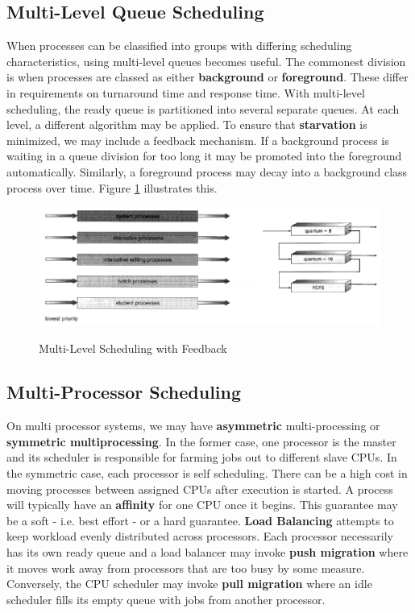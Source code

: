 \documentclass[10pt,a4paper]{article}
\begin{document}
\subsection{Multi-Level Queue Scheduling}
When processes can be classified into groups with differing scheduling characteristics, using multi-level queues becomes useful. The commonest division is when processes are classed as either {\bf background} or {\bf foreground}. These differ in requirements on turnaround time and response time. With multi-level scheduling, the ready queue is partitioned into several separate queues. At each level, a different algorithm may be applied. To ensure that {\bf starvation} is minimized, we may include a feedback mechanism. If a background process is waiting in a queue division for too long it may be promoted into the foreground automatically. Similarly, a foreground process may decay into a background class process over time. Figure \ref{mlq} illustrates this. 
\begin{figure}
\caption{Multi-Level Scheduling with Feedback \cite{OSCONCEPTS}}
\begin{center}
\includegraphics[scale=0.36]{../images/ml-sched.png}
\label{mlq}
\end{center}
\end{figure}
\subsection{Multi-Processor Scheduling}
On multi processor systems, we may have {\bf asymmetric} multi-processing or {\bf symmetric multiprocessing}. In the former case, one processor is the master and its scheduler is responsible for farming jobs out to different slave CPUs. In the symmetric case, each processor is self scheduling. There can be a high cost in moving processes between assigned CPUs after execution is started. A process will typically have an {\bf affinity} for one CPU once it begins. This guarantee may be a soft - i.e. best effort - or a hard guarantee. 
\newline\newline
{\bf Load Balancing} attempts to keep workload evenly distributed across processors. Each processor necessarily has its own ready queue and a load balancer may invoke {\bf push migration} where it moves work away from processors that are too busy by some measure. Conversely, the CPU scheduler may invoke {\bf pull migration} where an idle scheduler fills its empty queue with jobs from another processor.
\end{document}
